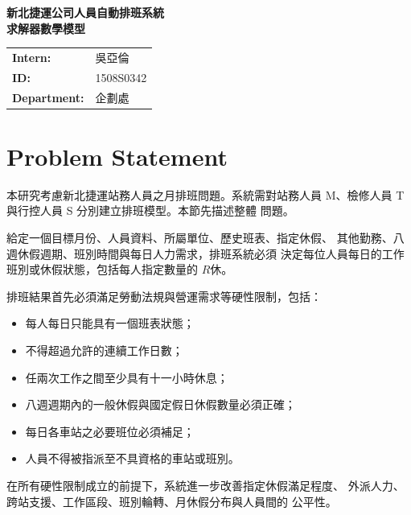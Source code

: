 \documentclass[12pt]{article}
\begin{document}
\thispagestyle{fancy}


\begin{center}
  {\large \bfseries 新北捷運公司人員自動排班系統} \\
  \vspace{1em}
  {\Large \bfseries 求解器數學模型} \\
\end{center}

\vspace{1em}

\begin{tabular}{@{}l l}
  \textbf{Intern:} & 吳亞倫 \\[-5pt]
  \textbf{ID:} & 1508S0342  \\[-5pt]
  \textbf{Department:} & 企劃處
\end{tabular}

\bigskip
\section{Problem Statement}

本研究考慮新北捷運站務人員之月排班問題。系統需對站務人員
M、檢修人員 T 與行控人員 S 分別建立排班模型。本節先描述整體
問題。

給定一個目標月份、人員資料、所屬單位、歷史班表、指定休假、
其他勤務、八週休假週期、班別時間與每日人力需求，排班系統必須
決定每位人員每日的工作班別或休假狀態，包括每人指定數量的 \(R休\)。

排班結果首先必須滿足勞動法規與營運需求等硬性限制，包括：

\begin{itemize}
  \item 每人每日只能具有一個班表狀態；
  \item 不得超過允許的連續工作日數；
  \item 任兩次工作之間至少具有十一小時休息；
  \item 八週週期內的一般休假與國定假日休假數量必須正確；
  \item 每日各車站之必要班位必須補足；
  \item 人員不得被指派至不具資格的車站或班別。
\end{itemize}

在所有硬性限制成立的前提下，系統進一步改善指定休假滿足程度、
外派人力、跨站支援、工作區段、班別輪轉、月休假分布與人員間的
公平性。
\end{document}
